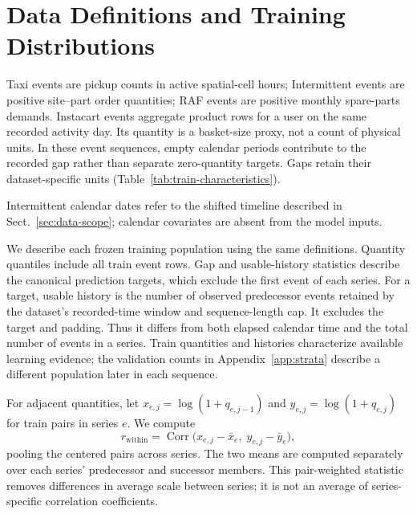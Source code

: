 \documentclass[runningheads]{llncs}
\begin{document}
\section{Data Definitions and Training Distributions}\label{app:data-characteristics}
Taxi events are pickup counts in active spatial-cell hours; Intermittent
events are positive site--part order quantities; RAF events are positive
monthly spare-parts demands. Instacart events aggregate product rows for a
user on the same recorded activity day. Its quantity is a basket-size proxy,
not a count of physical units. In these event sequences, empty calendar
periods contribute to the recorded gap rather than separate zero-quantity
targets. Gaps retain their dataset-specific units (Table~\ref{tab:train-characteristics}).

Intermittent calendar dates refer to the shifted timeline described in
Sect.~\ref{sec:data-scope}; calendar covariates are absent from
the model inputs.

We describe each frozen training population using the same definitions.
Quantity quantiles include all train event rows. Gap and usable-history
statistics describe the canonical prediction targets, which exclude the
first event of each series. For a target, usable history is the number of
observed predecessor events retained by the dataset's recorded-time window
and sequence-length cap. It excludes the target and padding. Thus it differs
from both elapsed calendar time and the total number of events in a series.
Train quantities and histories characterize available learning evidence;
the validation counts in Appendix~\ref{app:strata} describe a different
population later in each sequence.

For adjacent quantities, let $x_{e,j}=\log(1+q_{e,j-1})$ and
$y_{e,j}=\log(1+q_{e,j})$ for train pairs in series $e$. We compute
\begin{equation}
 r_{\mathrm{within}}=\operatorname{Corr}
 \bigl(x_{e,j}-\bar x_e,\;y_{e,j}-\bar y_e\bigr),
 \label{eq:within-correlation}
\end{equation}
pooling the centered pairs across series. The two means are computed
separately over each series' predecessor and successor members. This
pair-weighted statistic removes differences in average scale between series;
it is not an average of series-specific correlation coefficients.
\end{document}
